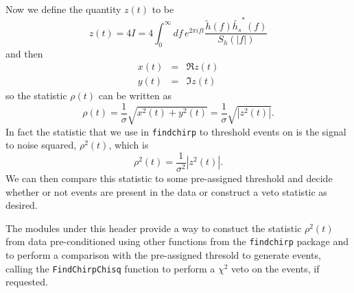 Now we define the quantity $z(t)$ to be
\begin{equation}
z(t) = 4 I = 4 \int_{0}^{\infty} df\, e^{2\pi i f t}\frac{\tilde{h}(f)
\tilde{h_s}^\ast(f)}{S_h\left(\left|f\right|\right)}
\end{equation}
and then
\begin{eqnarray}
x(t) &=& \Re z(t) \\
y(t) &=& \Im z(t)
\end{eqnarray}
so the statistic $\rho(t)$ can be written as
\begin{equation}
\rho(t) = \frac{1}{\sigma} \sqrt{x^2(t) + y^2(t)} 
= \frac{1}{\sigma} \sqrt{|z^2(t)|}.
\end{equation}
In fact the statistic that we use in \texttt{findchirp} to threshold events on
is the signal to noise squared, $\rho^2 (t)$, which is
\begin{equation}
\rho^2(t) = \frac{1}{\sigma^2} \left|z^2(t)\right|.
\end{equation}
We can then compare this statistic to some pre-assigned threshold and decide
whether or not events are present in the data or construct a veto statistic
as desired.

The modules under this header provide a way to constuct the statistic
$\rho^2(t)$ from data pre-conditioned using other functions from the
\texttt{findchirp} package and to perform a comparison with the pre-assigned
thresold to generate events, calling the \texttt{FindChirpChisq} function to
perform a $\chi^2$ veto on the events, if requested.
